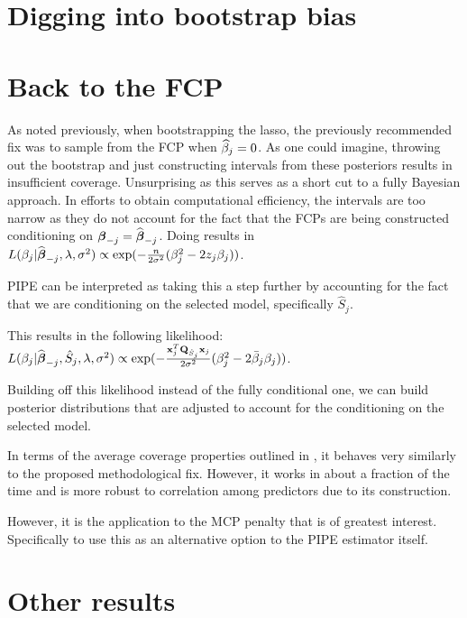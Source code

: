 \section{Digging into bootstrap bias}



\section{Back to the FCP}

As noted previously, when bootstrapping the lasso, the previously recommended fix was to sample from the FCP when $\widehat{\beta}_j = 0$. As one could imagine, throwing out the bootstrap and just constructing intervals from these posteriors results in insufficient coverage. Unsurprising as this serves as a short cut to a fully Bayesian approach. In efforts to obtain computational efficiency, the intervals are too narrow as they do not account for the fact that the FCPs are being constructed conditioning on $\boldsymbol{\beta}_{-j} = \widehat{\boldsymbol{\beta}}_{-j}$. Doing results in $L(\beta_j|\widehat{\boldsymbol{\beta}}_{-j}, \lambda, \sigma^2) \propto \exp(-\frac{n}{2\sigma^2}(\beta_{j}^2 - 2 z_{j} \beta_{j}))$.

PIPE can be interpreted as taking this a step further by accounting for the fact that we are conditioning on the selected model, specifically $\hat{S}_j$. 


This results in the following likelihood: $L(\beta_j|\widehat{\boldsymbol{\beta}}_{-j}, \hat{S}_j, \lambda, \sigma^2) \propto \exp(-\frac{\mathbf{x}_j^T \mathbf{Q}_{\hat{S}_j} \mathbf{x}_j}{2\sigma^2}(\beta_{j}^2 - 2 \bar{\beta}_{j} \beta_{j}))$. 

Building off this likelihood instead of the fully conditional one, we can build posterior distributions that are adjusted to account for the conditioning on the selected model.

In terms of the average coverage properties outlined in , it behaves very similarly to the proposed methodological fix. However, it works in about a fraction of the time and is more robust to correlation among predictors due to its construction. 

However, it is the application to the MCP penalty that is of greatest interest. Specifically to use this as an alternative option to the PIPE estimator itself.

\section{Other results}

